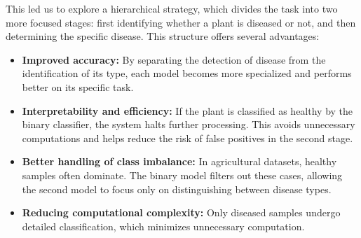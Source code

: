 This led us to explore a hierarchical strategy, which divides the task into two more focused stages: first identifying whether a plant is diseased or not, and then determining the specific disease. This structure offers several advantages:

\begin{itemize}
\item \textbf{Improved accuracy:} By separating the detection of disease from the identification of its type, each model becomes more specialized and performs better on its specific task.

\item \textbf{Interpretability and efficiency:} If the plant is classified as healthy by the binary classifier, the system halts further processing. This avoids unnecessary computations and helps reduce the risk of false positives in the second stage.

\item \textbf{Better handling of class imbalance:} In agricultural datasets, healthy samples often dominate. The binary model filters out these cases, allowing the second model to focus only on distinguishing between disease types.

\item \textbf{Reducing computational complexity:} Only diseased samples undergo detailed classification, which minimizes unnecessary computation.
\end{itemize}

